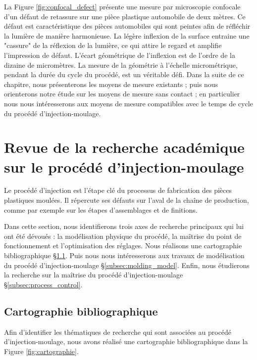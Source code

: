 La Figure \ref{fig:confocal_defect} présente une mesure par microscopie confocale d'un défaut de retassure sur une pièce plastique automobile de deux mètres.
Ce défaut est caractéristique des pièces automobiles qui sont peintes afin de réfléchir la lumière de manière harmonieuse.
La légère inflexion de la surface entraine une "cassure" de la réflexion de la lumière, ce qui attire le regard et amplifie l'impression de défaut.
L'écart géométrique de l'inflexion est de l'ordre de la dizaine de micromètres.
La mesure de la géométrie à l'échelle micrométrique, pendant la durée du cycle du procédé, est un véritable défi.
Dans la suite de ce chapitre, nous présenterons les moyens de mesure existants ; puis nous orienterons notre étude sur les moyens de mesure sans contact ; en particulier nous nous intéresserons aux moyens de mesure compatibles avec le temps de cycle du procédé d'injection-moulage.


\newpage
\section{Revue de la recherche académique sur le procédé d'injection-moulage}  \label{sec:research_topics}
Le procédé d'injection est l'étape clé du processus de fabrication des pièces plastiques moulées.
Il répercute ses défauts sur l'aval de la chaîne de production, comme par exemple sur les étapes d'assemblages et de finitions.

Dans cette section, nous identifierons trois axes de recherche principaux qui lui ont été dévoués : la modélisation physique du procédé, la maîtrise du point de fonctionnement et l'optimisation des réglages.
Nous réalisons une cartographie bibliographique §\ref{subsec:injection_research}.
Puis nous nous intéresserons aux travaux de modélisation du procédé d'injection-moulage §\ref{subsec:molding_model}.
Enfin, nous étudierons la recherche sur la maîtrise du procédé d'injection-moulage §\ref{subsec:process_control}.

\subsection{Cartographie bibliographique} \label{subsec:injection_research}
Afin d'identifier les thématiques de recherche qui sont associées au procédé d'injection-moulage, nous avons réalisé une cartographie bibliographique dans la Figure \ref{fig:cartographie}.

